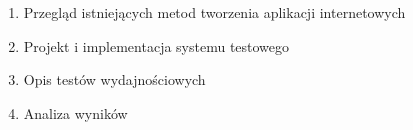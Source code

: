 \begin{enumerate}
 \item Przegląd istniejących metod tworzenia aplikacji internetowych
 \item Projekt i implementacja systemu testowego
 \item Opis testów wydajnościowych
 \item Analiza wyników
\end{enumerate}
